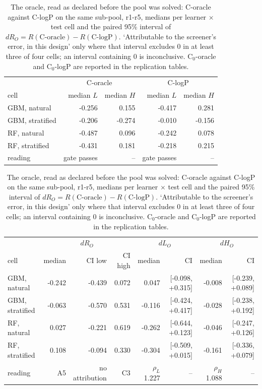 \begin{table}[htbp]
\centering
\small
\setlength{\tabcolsep}{4pt}
\caption{The oracle, read as declared before the pool was solved: C-oracle against C-logP on the same sub-pool, r1-r5, medians per learner $\times$ test cell and the paired 95\% interval of $dR_O = R(\mbox{C-oracle}) - R(\mbox{C-logP})$. `Attributable to the screener's error, in this design' only where that interval excludes 0 in at least three of four cells; an interval containing 0 is inconclusive. C$_0$-oracle and C$_0$-logP are reported in the replication tables.}
\label{tab:rep:oracle}
\begin{tabular}{lrrrr}
\toprule
 & \multicolumn{2}{c}{C-oracle} & \multicolumn{2}{c}{C-logP} \\
\cmidrule(lr){2-3} \cmidrule(lr){4-5}
cell & median $L$ & median $H$ & median $L$ & median $H$ \\
\midrule
GBM, natural & -0.256 & 0.155 & -0.417 & 0.281 \\
GBM, stratified & -0.206 & -0.274 & -0.010 & -0.156 \\
RF, natural & -0.487 & 0.096 & -0.242 & 0.078 \\
RF, stratified & -0.431 & 0.181 & -0.218 & 0.215 \\
reading & gate passes & -- & gate passes & -- \\
\bottomrule
\end{tabular}
\par\medskip
\begin{tabular}{lrrrrrrr}
\toprule
 & \multicolumn{3}{c}{$dR_O$} & \multicolumn{2}{c}{$dL_O$} & \multicolumn{2}{c}{$dH_O$} \\
\cmidrule(lr){2-4} \cmidrule(lr){5-6} \cmidrule(lr){7-8}
cell & median & CI low & CI high & median & CI & median & CI \\
\midrule
GBM, natural & -0.242 & -0.439 & 0.072 & 0.047 & [-0.098, +0.315] & -0.008 & [-0.239, +0.089] \\
GBM, stratified & -0.063 & -0.570 & 0.531 & -0.116 & [-0.424, +0.417] & -0.028 & [-0.238, +0.192] \\
RF, natural & 0.027 & -0.221 & 0.619 & -0.262 & [-0.644, +0.123] & -0.046 & [-0.247, +0.126] \\
RF, stratified & 0.108 & -0.094 & 0.330 & -0.304 & [-0.509, +0.015] & -0.161 & [-0.336, +0.079] \\
reading & A5 & \shortstack[r]{no\\attribution} & C3 & \shortstack[r]{$\rho_L$\\1.227} & -- & \shortstack[r]{$\rho_H$\\1.088} & -- \\
\bottomrule
\end{tabular}
\end{table}
